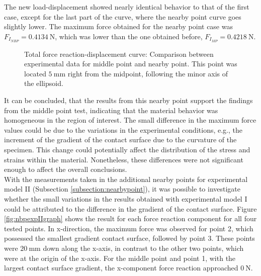 The new load-displacement showed nearly identical behavior to that of the 
first case, except for the last part of the curve, where the nearby point curve goes 
slightly lower. The maximum force obtained for the nearby point case was $F_{I_{NBP}} = \SI{0.4134}{\newton}$, 
which was lower than the one obtained before, $F_{I_{MP}} = \SI{0.4218}{\newton}$.\\

\begin{figure}%
    \centering
   \quad
   \caption[Experimental data for middle point vs. nearby point]{Total force reaction-displacement curve: Comparison between experimental data for middle point and nearby point. This point was located $\SI{5}{\milli\m}$ right from the midpoint, following the minor axis of the ellipsoid.}%
   \label{fig:midpointIvsnbpointI}%
\end{figure}

It can be concluded, that the results from this nearby point support the 
findings from the middle point test, indicating that the material behavior was
homogeneous in the region of interest. The small difference in the maximum force values could 
be due to the variations in the experimental conditions, e.g., the increment of the 
gradient of the contact surface due to the curvature of the specimen. This change 
could potentially affect the distribution of the stress and strains within the material.
Nonetheless, these differences were not significant enough to affect the overall conclusions.\\

With the measurements taken in the additional nearby points for experimental model II (Subsection \ref{subsection:nearbypoint}), 
it was possible to investigate whether the small variations in the results obtained with 
experimental model I could be attributed to the difference in the gradient of the contact surface.
Figure \ref{fig:nbpexpIIgraph} shows the result for each force reaction component for all four 
tested points. In x-direction, the maximum force was observed for point \SI{2}{}, which possessed the smallest gradient 
contact surface, followed by point \SI{3}{}. These points were $\SI{20}{\milli \m}$ down along the x-axis, in contrast 
to the other two points, which were at the origin of the x-axis.
For the middle point and point \SI{1}{}, with the largest contact surface gradient, the 
x-component force reaction approached $\SI{0}{\newton}$. 

